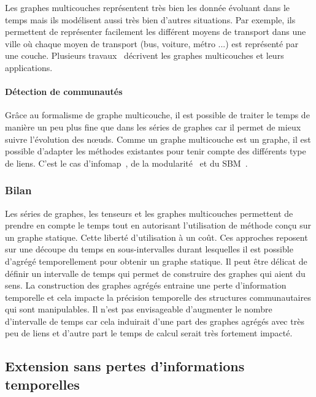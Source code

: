 Les graphes multicouches représentent très bien les donnée évoluant dans le temps mais ils modélisent aussi très bien d'autres situations.
Par exemple, ils permettent de représenter facilement les différent moyens de transport dans une ville où chaque moyen de transport (bus, voiture, métro ...) est représenté par une couche.
Plusieurs travaux~\cite{DeDomenico2013,Kivela2014,Boccaletti2014} décrivent les graphes multicouches et leurs applications.



\paragraph{Détection de communautés}
Grâce au formalisme de graphe multicouche, il est possible de traiter le temps de manière un peu plus fine que dans les séries de graphes car il permet de mieux suivre l'évolution des n\oe uds.
Comme un graphe multicouche est un graphe, il est possible d'adapter les méthodes existantes pour tenir compte des différents type de liens.
C'est le cas d'infomap~\cite{DeDomenico2014}, de la modularité~\cite{Mucha2010,Bassett2013,Bazzi2016} et du SBM~\cite{Stanley2015,Peixoto2015c}.


\subsubsection{Bilan}
Les séries de graphes, les tenseurs et les graphes multicouches permettent de prendre en compte le temps tout en autorisant l'utilisation de méthode conçu sur un graphe statique.
Cette liberté d'utilisation à un coût.
Ces approches reposent sur une découpe du temps en sous-intervalles durant lesquelles il est possible d'agrégé temporellement pour obtenir un graphe statique.
Il peut être délicat de définir un intervalle de temps qui permet de construire des graphes qui aient du sens.
La construction des graphes agrégés entraine une perte d'information temporelle et cela impacte la précision temporelle des structures communautaires qui sont manipulables.
Il n'est pas envisageable d'augmenter le nombre d'intervalle de temps car cela induirait d'une part des graphes agrégés avec très peu de liens et d'autre part le temps de calcul serait très fortement impacté.


\subsection{Extension sans pertes d'informations temporelles}
\label{subsec:pasperte_info}
